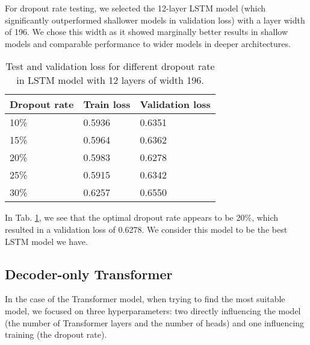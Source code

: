 For dropout rate testing, we selected the 12-layer LSTM model (which significantly outperformed shallower models in validation loss) with a layer width of 196. We chose this width as it showed marginally better results in shallow models and comparable performance to wider models in deeper architectures.
\\

\begin{table}[!h]
	\centering
	\begin{tabular}{|l|l|l|}
		\hline
		Dropout rate & Train loss & Validation loss \\ \hline
		10\%         & 0.5936    & 0.6351                \\ \hline
		15\%         & 0.5964    & 0.6362                \\ \hline
		20\%         & 0.5983    & 0.6278                \\ \hline
		25\%         & 0.5915    & 0.6342                \\ \hline
		30\%         & 0.6257    & 0.6550                \\ \hline 
	\end{tabular}
	\caption{Test and validation loss for different dropout rate in LSTM model with 12 layers of width 196.}
	\label{tab:lstm_dropout}
\end{table}

In Tab. \ref{tab:lstm_dropout}, we see that the optimal dropout rate appears to be 20\%, which resulted in a validation loss of 0.6278. We consider this model to be the best LSTM model we have.

\subsection{Decoder-only Transformer}

In the case of the Transformer model, when trying to find the most suitable model, we focused on three hyperparameters: two directly influencing the model (the number of Transformer layers and the number of heads) and one influencing training (the dropout rate).
\\


